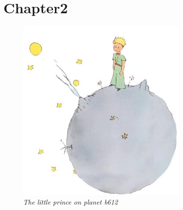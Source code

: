 \section{Chapter2}
		\label{sec:chapter2}

	\lipsum[1]
	\begin{figure} [H]
	 \centering
	  \includegraphics[width=0.75\textwidth]{images/princeplanet.jpg}
		\caption[The little prince on planet b612]{\centering \textit{The little prince on planet b612}}
	  \label{fig:1}
	\end{figure}
\newpage
